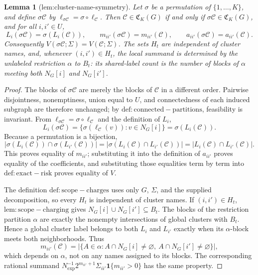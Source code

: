 \documentclass{article}
\newtheorem{lemma}{Lemma}
\begin{document}
\begin{lemma}[lem:cluster-name-symmetry]\label{lem:cluster-name-symmetry}
Let \(\sigma\) be a permutation of \(\{1,\ldots,K\}\), and define \(\sigma\mathcal C\) by \(\ell_{\sigma\mathcal C}=\sigma\circ\ell_{\mathcal C}\).  Then \(\mathcal C\in\mathfrak C_K(G)\) if and only if \(\sigma\mathcal C\in\mathfrak C_K(G)\), and for all \(i,i'\in U\),
\[
 L_i(\sigma\mathcal C)=\sigma(L_i(\mathcal C)),\qquad
 m_{ii'}(\sigma\mathcal C)=m_{ii'}(\mathcal C),\qquad
 a_{ii'}(\sigma\mathcal C)=a_{ii'}(\mathcal C).
\]
Consequently \(V(\sigma\mathcal C;\Sigma)=V(\mathcal C;\Sigma)\).  The sets \(H_t\) are independent of cluster names, and, whenever \((i,i')\in H_t\), the local summand is determined by the unlabeled restriction \(\alpha\) to \(B_t\): its shared-label count is the number of blocks of \(\alpha\) meeting both \(N_G[i]\) and \(N_G[i']\).
\end{lemma}
\begin{proof}
The blocks of \(\sigma\mathcal C\) are merely the blocks of \(\mathcal C\) in a different order.  Pairwise disjointness, nonemptiness, union equal to \(U\), and connectedness of each induced subgraph are therefore unchanged; by \(\mathrm{def:connected-partitions}\), feasibility is invariant.  From \(\ell_{\sigma\mathcal C}=\sigma\circ\ell_{\mathcal C}\) and the definition of \(L_i\),
\[
 L_i(\sigma\mathcal C)
 =\{\sigma(\ell_{\mathcal C}(v)):v\in N_G[i]\}
 =\sigma(L_i(\mathcal C)).
\]
Because a permutation is a bijection,
\[
 |\sigma(L_i(\mathcal C))\cap\sigma(L_{i'}(\mathcal C))|
 =|\sigma(L_i(\mathcal C)\cap L_{i'}(\mathcal C))|
 =|L_i(\mathcal C)\cap L_{i'}(\mathcal C)|.
\]
This proves equality of \(m_{ii'}\); substituting it into the definition of \(a_{ii'}\) proves equality of the coefficients, and substituting those equalities term by term into \(\mathrm{def:exact-risk}\) proves equality of \(V\).

The definition \(\mathrm{def:scope-charges}\) uses only \(G\), \(\Sigma\), and the supplied decomposition, so every \(H_t\) is independent of cluster names.  If \((i,i')\in H_t\), \(\mathrm{lem:scope-charging}\) gives \(N_G[i]\cup N_G[i']\subseteq B_t\).  The blocks of the restriction partition \(\alpha\) are exactly the nonempty intersections of global clusters with \(B_t\).  Hence a global cluster label belongs to both \(L_i\) and \(L_{i'}\) exactly when its \(\alpha\)-block meets both neighborhoods.  Thus
\[
 m_{ii'}(\mathcal C)
 =\bigl|\{A\in\alpha:A\cap N_G[i]\ne\varnothing,
                         \ A\cap N_G[i']\ne\varnothing\}\bigr|,
\]
which depends on \(\alpha\), not on any names assigned to its blocks.  The corresponding rational summand \(N_{\exp}^{-1}2^{m_{ii'}+1}\Sigma_{ii'}\mathbf 1\{m_{ii'}>0\}\) has the same property.
\end{proof}
\end{document}
